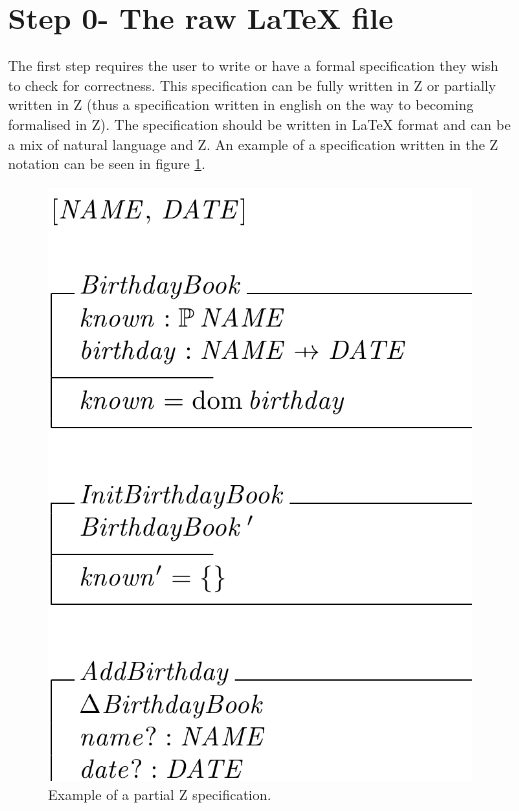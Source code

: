 \section{Step 0- The raw LaTeX file}

The first step requires the user to write or have a formal specification they wish to check for correctness. This specification can be fully written in Z or partially written in Z (thus a specification written in english on the way to becoming formalised in Z). The specification should be written in \LaTeX{} format and can be a mix of natural language and Z. An example of a specification written in the Z notation can be seen in figure \ref{fig:zexample}.

\begin{figure}[H]
 \begin{center}
 \includegraphics [scale=0.25]{Figures/Design/zspec.png}
 \caption{Example of a partial Z specification.}
 \label{fig:zexample}
\end{center}
\end{figure} 

